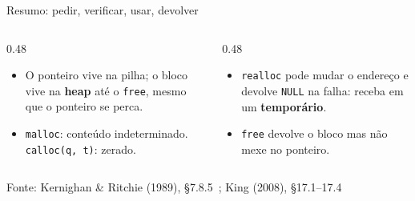 \documentclass[aspectratio=169]{beamer}
\newcommand{\fonte}[1]{\vfill\hfill{\scriptsize\textcolor{UFSGray}{Fonte: #1}}}
\begin{document}
\begin{frame}{Resumo: pedir, verificar, usar, devolver}
  \begin{center}
  \end{center}
  \small
  \begin{columns}[T]
    \begin{column}{0.48\textwidth}
      \begin{itemize}
        \item O ponteiro vive na pilha; o bloco vive na \textbf{heap} até o
          \texttt{free}, mesmo que o ponteiro se perca.
        \item \texttt{malloc}: conteúdo indeterminado. \texttt{calloc(q, t)}:
          zerado.
      \end{itemize}
    \end{column}
    \begin{column}{0.48\textwidth}
      \begin{itemize}
        \item \texttt{realloc} pode mudar o endereço e devolve \texttt{NULL} na
          falha: receba em um \textbf{temporário}.
        \item \texttt{free} devolve o bloco mas não mexe no ponteiro.
      \end{itemize}
    \end{column}
  \end{columns}
  \fonte{Kernighan \& Ritchie (1989), §7.8.5~\cite{kernighan1989c}; King (2008), §17.1--17.4~\cite{king2008c}}
\end{frame}
\end{document}
